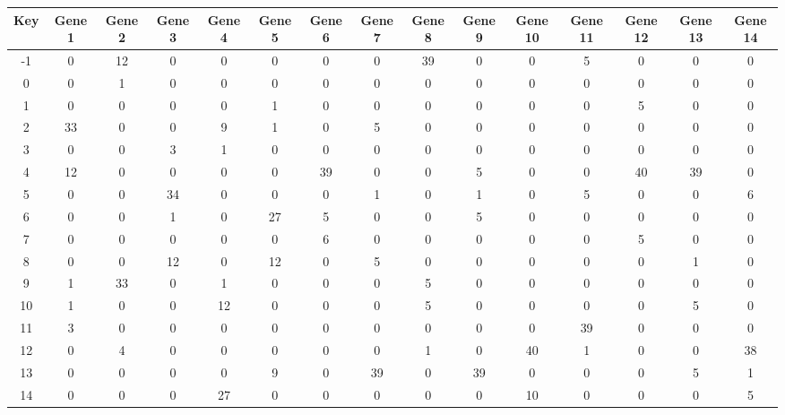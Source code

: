 \begin{tabular}{|c|c|c|c|c|c|c|c|c|c|c|c|c|c|c|}
\hline
Key & Gene 1 & Gene 2 & Gene 3 & Gene 4 & Gene 5 & Gene 6 & Gene 7 & Gene 8 & Gene 9 & Gene 10 & Gene 11 & Gene 12 & Gene 13 & Gene 14 \\
\hline
-1 & 0 & 12 & 0 & 0 & 0 & 0 & 0 & 39 & 0 & 0 & 5 & 0 & 0 & 0 \\
0 & 0 & 1 & 0 & 0 & 0 & 0 & 0 & 0 & 0 & 0 & 0 & 0 & 0 & 0 \\
1 & 0 & 0 & 0 & 0 & 1 & 0 & 0 & 0 & 0 & 0 & 0 & 5 & 0 & 0 \\
2 & 33 & 0 & 0 & 9 & 1 & 0 & 5 & 0 & 0 & 0 & 0 & 0 & 0 & 0 \\
3 & 0 & 0 & 3 & 1 & 0 & 0 & 0 & 0 & 0 & 0 & 0 & 0 & 0 & 0 \\
4 & 12 & 0 & 0 & 0 & 0 & 39 & 0 & 0 & 5 & 0 & 0 & 40 & 39 & 0 \\
5 & 0 & 0 & 34 & 0 & 0 & 0 & 1 & 0 & 1 & 0 & 5 & 0 & 0 & 6 \\
6 & 0 & 0 & 1 & 0 & 27 & 5 & 0 & 0 & 5 & 0 & 0 & 0 & 0 & 0 \\
7 & 0 & 0 & 0 & 0 & 0 & 6 & 0 & 0 & 0 & 0 & 0 & 5 & 0 & 0 \\
8 & 0 & 0 & 12 & 0 & 12 & 0 & 5 & 0 & 0 & 0 & 0 & 0 & 1 & 0 \\
9 & 1 & 33 & 0 & 1 & 0 & 0 & 0 & 5 & 0 & 0 & 0 & 0 & 0 & 0 \\
10 & 1 & 0 & 0 & 12 & 0 & 0 & 0 & 5 & 0 & 0 & 0 & 0 & 5 & 0 \\
11 & 3 & 0 & 0 & 0 & 0 & 0 & 0 & 0 & 0 & 0 & 39 & 0 & 0 & 0 \\
12 & 0 & 4 & 0 & 0 & 0 & 0 & 0 & 1 & 0 & 40 & 1 & 0 & 0 & 38 \\
13 & 0 & 0 & 0 & 0 & 9 & 0 & 39 & 0 & 39 & 0 & 0 & 0 & 5 & 1 \\
14 & 0 & 0 & 0 & 27 & 0 & 0 & 0 & 0 & 0 & 10 & 0 & 0 & 0 & 5 \\
\hline
\end{tabular}